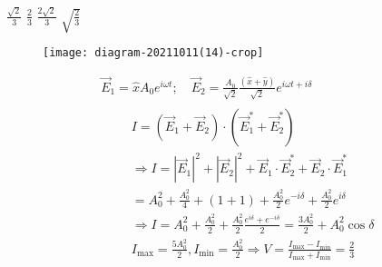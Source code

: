 \begin{enumerate}
\begin{tasks}
	\task[\textbf{A.}] $\frac{\sqrt{2}}{3}$
	\task[\textbf{B.}]$\frac{2}{3}$
	\task[\textbf{C.}]$\frac{2 \sqrt{2}}{3}$
	\task[\textbf{D.}]$\sqrt{\frac{2}{3}}$
\end{tasks}
\begin{answer}
	\begin{figure}[H]
		\centering
		\texttt{[image: diagram-20211011(14)-crop]}
	\end{figure}
	$$
	\begin{aligned}
	& \vec{E}_{1}=\hat{x} A_{0} e^{i \omega t} ; \quad \vec{E}_{2}=\frac{A_{0}}{\sqrt{2}} \frac{(\hat{x}+\hat{y})}{\sqrt{2}} e^{i \omega t+i \delta} \\
	&\qquad \begin{array}{l}
	I=\left(\vec{E}_{1}+\vec{E}_{2}\right) \cdot\left(\vec{E}_{1}^{*}+\vec{E}_{2}^{*}\right) \\
	\Rightarrow I=\left|\vec{E}_{1}\right|^{2}+\left|\vec{E}_{2}\right|^{2}+\vec{E}_{1} \cdot \vec{E}_{2}^{*}+\vec{E}_{2} \cdot \vec{E}_{1}^{*} \\
	=A_{0}^{2}+\frac{A_{0}^{2}}{4}+(1+1)+\frac{A_{0}^{2}}{2} e^{-i \delta}+\frac{A_{0}^{2}}{2} e^{i \delta} \\
	\Rightarrow I=A_{0}^{2}+\frac{A_{0}^{2}}{2}+\frac{A_{0}^{2}}{2} \frac{e^{i \delta}+e^{-i \delta}}{2}=\frac{3 A_{0}^{2}}{2}+A_{0}^{2} \cos \delta \\
	I_{\max }=\frac{5 A_{0}^{2}}{2}, I_{\min }=\frac{A_{0}^{2}}{2} \Rightarrow V=\frac{I_{\max }-I_{\min }}{I_{\max }+I_{\min }}=\frac{2}{3}
	\end{array}
	\end{aligned}$$	
\end{answer}
\end{enumerate}




















